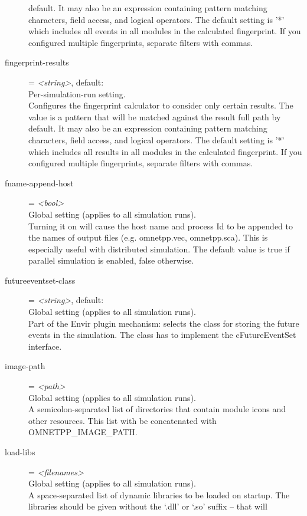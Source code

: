 \begin{description}
    default. It may also be an expression containing pattern matching
    characters, field access, and logical operators. The default setting is '*'
    which includes all events in all modules in the calculated fingerprint. If
    you configured multiple fingerprints, separate filters with commas.
\item[fingerprint-results] = \textit{<string>}, default: \ttt{*}\\
    Per-simulation-run setting.\\
    Configures the fingerprint calculator to consider only certain results. The
    value is a pattern that will be matched against the result full path by
    default. It may also be an expression containing pattern matching
    characters, field access, and logical operators. The default setting is '*'
    which includes all results in all modules in the calculated fingerprint. If
    you configured multiple fingerprints, separate filters with commas.
\item[fname-append-host] = \textit{<bool>}\\
    Global setting (applies to all simulation runs).\\
    Turning it on will cause the host name and process Id to be appended to the
    names of output files (e.g. omnetpp.vec, omnetpp.sca). This is especially
    useful with distributed simulation. The default value is true if parallel
    simulation is enabled, false otherwise.
\item[futureeventset-class] = \textit{<string>}, default: \\
    Global setting (applies to all simulation runs).\\
    Part of the Envir plugin mechanism: selects the class for storing the
    future events in the simulation. The class has to implement the
    cFutureEventSet interface.
\item[image-path] = \textit{<path>}\\
    Global setting (applies to all simulation runs).\\
    A semicolon-separated list of directories that contain module icons and
    other resources. This list with be concatenated with OMNETPP\_IMAGE\_PATH.
\item[load-libs] = \textit{<filenames>}\\
    Global setting (applies to all simulation runs).\\
    A space-separated list of dynamic libraries to be loaded on startup. The
    libraries should be given without the `.dll' or `.so' suffix -- that will

\end{description}
